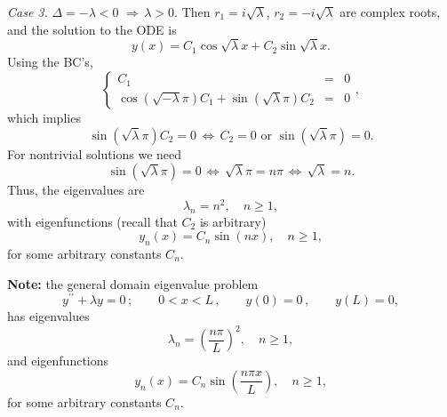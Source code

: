 \documentclass[11pt]{article}
\begin{document}
\begin{solution}
\par \textsl{Case 3.} $\Delta = -\lambda <0 \,\, \Rightarrow \, \lambda>0.$ Then $r_{1}=i\sqrt{\lambda}$, $r_{2}=-i\sqrt{\lambda}$ are complex roots, and the solution to the ODE is
\[y(x)=C_{1}\cos\sqrt{\lambda}x+C_{2}\sin\sqrt{\lambda}x.\]
Using the BC's,
\begin{equation*}
\left\{\begin{array}{rcl}
       C_{1} & = & 0\\
       \cos(\sqrt{-\lambda}\pi)C_{1} + \sin(\sqrt{\lambda}\pi)C_{2}&=&0
      \end{array}\right. ,
\end{equation*}
which implies 
\[\sin(\sqrt{\lambda}\pi)C_{2}=0 \,\Leftrightarrow\, C_{2} = 0 \text{ or } \sin(\sqrt{\lambda}\pi)=0.\]
For nontrivial solutions we need 
\[\sin(\sqrt{\lambda}\pi)=0 \,\Leftrightarrow \, \sqrt{\lambda}\pi=n\pi\,\Leftrightarrow \, \sqrt{\lambda}=n.\] 
Thus, the eigenvalues are
\[\boxed{\lambda_{n}=n^{2}}, \quad n\geq 1,\]
with eigenfunctions (recall that $C_{2}$ is arbitrary)
\[\boxed{y_{n}(x)=C_{n}\sin(nx)}, \quad n\geq 1,\]
for some arbitrary constants $C_{n}$.

\textbf{Note:} the general domain eigenvalue problem
\begin{equation*}
y^{\prime \prime} + \lambda y =0\,; \qquad  0<x<L \,, \qquad y(0)=0  \,,\qquad y(L) =0,
\end{equation*}
has eigenvalues
\[\boxed{\lambda_{n}=\left( \frac{n\pi}{L}\right)^{2}}, \quad n\geq 1,\]
and eigenfunctions
\[\boxed{y_{n}(x)=C_{n}\sin\left( \frac{n\pi x}{L} \right)}, \quad n\geq 1,\]
for some arbitrary constants $C_{n}$.

\end{solution}
\end{document}
